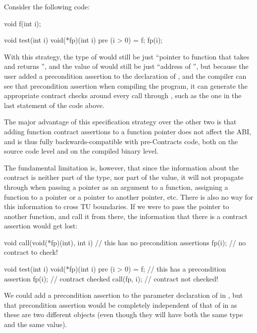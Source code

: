 Consider the following code:

\begin{codeblock}
void f(int i);

void test(int i) {
  void(*fp)(int i) pre (i > 0) = f;
  fp(i);
}
\end{codeblock}
With this strategy, the type of  would still be just ``pointer to function that takes  and returns '', and the value of  would still be just ``address of '', but because the user added a precondition assertion to the declaration of , and the compiler can see that precondition assertion when compiling the program, it can generate the appropriate contract checks around every call through , such as the one in the last statement of the code above.

The major advantage of this specification strategy over the other two is that adding function contract assertions to a function pointer does not affect the ABI, and is thus fully backwards-compatible with pre-Contracts code, both on the source code level and on the compiled binary level.

The fundamental limitation is, however, that since the information about the contract is neither part of the type, nor part of the value, it will not propagate through when passing a pointer as an argument to a function, assigning a function to a pointer or a pointer to another pointer, etc. There is also no way for this information to cross TU boundaries. If we were to pass the pointer  to another function, and call it from there, the information that there is a contract assertion would get lost:
\begin{codeblock}
void call(void(*fp)(int), int i) {    // this  has no precondition assertions
  fp(i);       // no contract to check!
}

void test(int i) {
  void(*fp)(int i) pre (i > 0) = f;   // this  has a precondition assertion
  fp(i);       // contract  checked
  call(fp, i); // contract  not checked!
}
\end{codeblock}
We could add a precondition assertion to the parameter declaration of  in , but that precondition assertion would be completely independent of that of  in  as these are two different objects (even though they will have both the same type and the same value).

